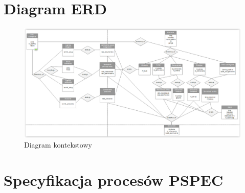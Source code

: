\documentclass[a4paper, 11pt]{article}
\begin{document}
		
	
	
	\section{Diagram ERD}
	\indent
	\begin{figure}[H]%
			\includegraphics[scale=0.8]{Img/ERD.png}
			\caption{Diagram kontekstowy}
	\end{figure}
	
	
	
	
	\newpage
	\section{Specyfikacja procesów PSPEC}
\end{document}
